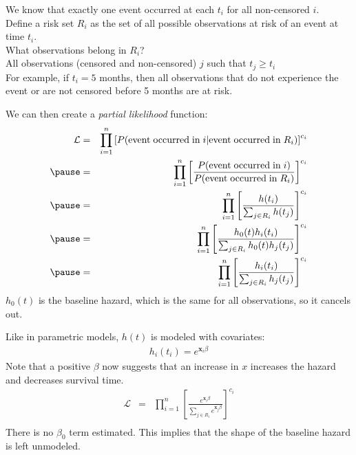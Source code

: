 \documentclass{beamer}
\begin{document}
\begin{frame}
We know that exactly one event occurred at each $t_i$ for all
non-censored $i$. \\
\pause
\bigskip
Define a risk set $R_i$ as the set of all possible observations at
risk of an event at time $t_i$.\\
\pause
\bigskip
What observations belong in $R_i$?\\
\pause
\bigskip
All observations (censored and non-censored) $j$ such
that $t_j \ge t_i$\\
\pause
\bigskip
For example, if $t_i = 5$ months, then all observations that do not
experience the event or are not censored before 5 months are at risk.

\end{frame}

\begin{frame}
We can then create a \emph{partial likelihood} function:
\pause
\begin{eqnarray*}
\mathcal{L} &=& \prod_{i=1}^n \left[ P(\mathrm{event \; occurred \; in} \; i |
\mathrm{event \; occurred \; in} \; R_i) \right] ^{c_i}  \\
\pause
&=& \prod_{i=1}^n \left[ \frac{P(\mathrm{event \; occurred \; in} \;
i)}{P(\mathrm{event \; occurred \; in} \; R_i)} \right] ^{c_i} \\
\pause
&=& \prod_{i=1}^n \left[ \frac{h(t_i)}{\sum_{j \in R_i} h(t_j)}
\right] ^{c_i}\\
\pause
&=& \prod_{i=1}^n \left[ \frac{h_0(t)h_i(t_i)}{\sum_{j \in R_i} h_0(t)h_j(t_j)}
\right] ^{c_i}\\
\pause
&=& \prod_{i=1}^n \left[ \frac{h_i(t_i)}{\sum_{j \in R_i} h_j(t_j)}
\right] ^{c_i}\\
\end{eqnarray*}
\pause
$h_0(t)$ is the baseline hazard, which is the same for all
observations, so it cancels out.

\end{frame}

\begin{frame}
Like in parametric models, $h(t)$ is modeled with covariates:
\pause
\begin{eqnarray*}
h_i(t_i) = e^{\mathbf{x}_i \beta}
\end{eqnarray*}
\pause
Note that a positive $\beta$ now suggests that an increase in $x$
increases the hazard and decreases survival time.
\pause
\begin{eqnarray*}
\mathcal{L} &=& \prod_{i=1}^n \left[ \frac{e^{\mathbf{x}_i
\beta}}{\sum_{j \in R_i} e^{\mathbf{x}_j \beta}}
\right] ^{c_i} \\
\end{eqnarray*}
\pause
There is no $\beta_0$ term estimated.  
\pause
This implies that the shape of the baseline hazard is left unmodeled.
\end{frame}
\end{document}
